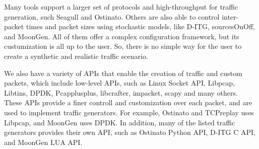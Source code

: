 Many tools support a larger set of protocols and high-throughput for traffic generation, such Seagull and Ostinato. Others are also able to control inter-packet times and packet sizes using stochastic models, like D-ITG\cite{ditg-paper}, sourcesOnOff\cite{sourcesonoff-paper}, and MoonGen. All of them offer a complex configuration framework, but its custumization is all up to the user. So, there is no simple way for the user to create a synthetic and realistic traffic scenario. 

We also have a variety of APIs that enable the creation of traffic and custom packets, which include low-level APIs, such as Linux Socket API,  Libpcap, Libtins, DPDK, Pcapplusplus, libcrafter, impacket, scapy and many others. These APIs provide a finer controll and customization over each packet, and are used to implement traffic generators. For example, Ostinato and TCPreplay uses Libpcap, and MoonGen uses DPDK. In addition, many of the listed traffic generators provides their own API, such as Ostinato Python API, D-ITG C API, and MoonGen LUA API. 





